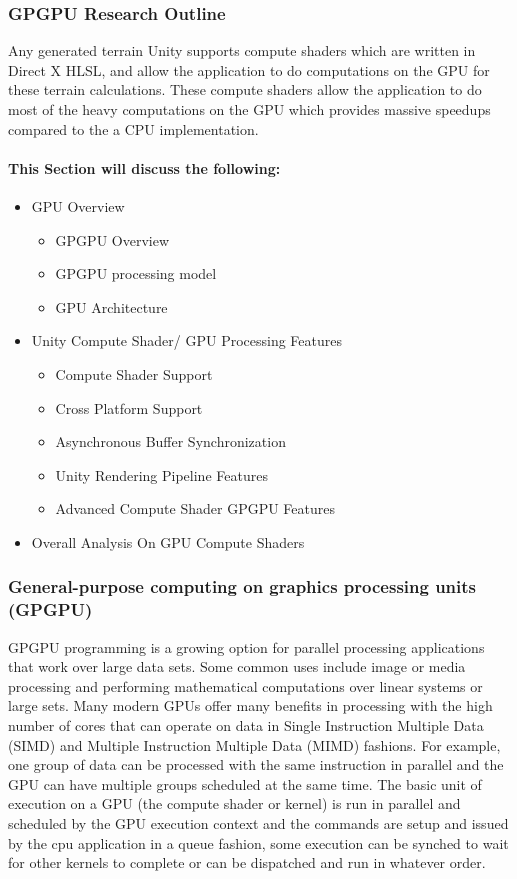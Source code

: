 \documentclass[a4paper,10pt]{article}
\begin{document}
\subsubsection{GPGPU Research Outline}
Any generated terrain Unity supports compute shaders which are written in Direct X HLSL, and allow the application to do computations on the GPU for
these terrain calculations. These compute shaders allow the application to do most of the heavy computations on the GPU which provides massive speedups compared to the a CPU implementation.
\paragraph{This Section will discuss the following:}
\begin{itemize}
	\item GPU Overview 
	\begin{itemize}
		\item GPGPU Overview
		\item GPGPU processing model
		\item GPU Architecture
	\end{itemize}
	\item Unity Compute Shader/ GPU Processing Features
	\begin{itemize}
		\item Compute Shader Support
		\item Cross Platform Support
		\item Asynchronous Buffer Synchronization
		\item Unity Rendering Pipeline Features
		\item Advanced Compute Shader GPGPU Features
	\end{itemize}
	\item Overall Analysis On GPU Compute Shaders
\end{itemize}
\pagebreak
\subsubsection{General-purpose computing on graphics processing units (GPGPU)}
GPGPU programming is a growing option for parallel processing applications that work over large data sets. Some common uses include image or media processing and 
performing mathematical computations over linear systems or large sets. Many modern GPUs offer many benefits in processing with the high number of cores that can operate on data 
in Single Instruction Multiple Data (SIMD) and Multiple Instruction Multiple Data (MIMD) fashions. For example, one group of data can be processed with the same instruction in parallel 
and the GPU can have multiple groups scheduled at the same time. The basic unit of execution on a GPU (the compute shader or kernel) is run in parallel and scheduled by the GPU execution context
and the commands are setup and issued by the cpu application in a queue fashion, some execution can be synched to wait for other kernels to complete or can be dispatched and run in whatever order.
\end{document}
